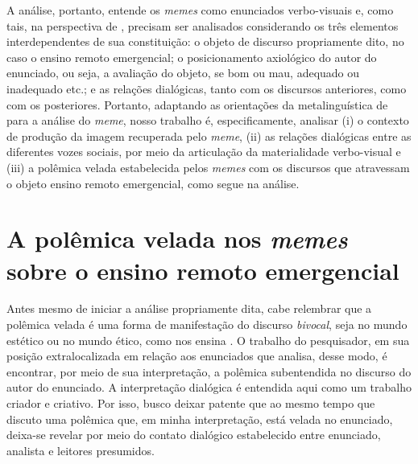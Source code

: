 \documentclass[portuguese]{textolivre}
\begin{document}
A análise, portanto, entende os \textit{memes} como enunciados verbo-visuais e, como tais, na perspectiva de \textcite{bakhtin2016generos}, precisam ser analisados considerando os três elementos interdependentes de sua constituição: o objeto de discurso propriamente dito, no caso o ensino remoto emergencial; o posicionamento axiológico do autor do enunciado, ou seja, a avaliação do objeto, se bom ou mau, adequado ou inadequado etc.; e as relações dialógicas, tanto com os discursos anteriores, como com os posteriores. Portanto, adaptando as orientações da metalinguística de \textcite{bakhtin2018problemas} para a análise do \textit{meme}, nosso trabalho é, especificamente, analisar (i) o contexto de produção da imagem recuperada pelo \textit{meme}, (ii) as relações dialógicas entre as diferentes vozes sociais, por meio da articulação da materialidade verbo-visual e (iii) a polêmica velada estabelecida pelos \textit{memes} com os discursos que atravessam o objeto ensino remoto emergencial, como segue na análise.
	
\section{A polêmica velada nos \textit{memes} sobre o ensino remoto emergencial}\label{sec-polemicadomeme} 	
	
Antes mesmo de iniciar a análise propriamente dita, cabe relembrar que a polêmica velada é uma forma de manifestação do discurso \textit{bivocal}, seja no mundo estético ou no mundo ético, como nos ensina \textcite{bakhtin2018problemas}. O trabalho do pesquisador, em sua posição extralocalizada em relação aos enunciados que analisa, desse modo, é encontrar, por meio de sua interpretação, a polêmica subentendida no discurso do autor do enunciado. A interpretação dialógica é entendida aqui como um trabalho criador e criativo. Por isso, busco deixar patente que ao mesmo tempo que discuto uma polêmica que, em minha interpretação, está velada no enunciado, deixa-se revelar por meio do contato dialógico estabelecido entre enunciado, analista e leitores presumidos.
	
\end{document}
